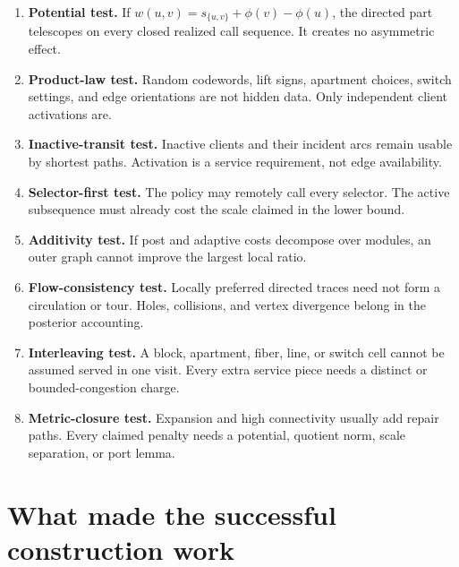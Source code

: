 \documentclass[11pt,a4paper]{article}
\begin{document}
\begin{enumerate}

\item \textbf{Potential test.}  If \(w(u,v)=s_{\{u,v\}}+\phi(v)-\phi(u)\), the directed part telescopes on every closed realized call sequence.  It creates no asymmetric effect.

\item \textbf{Product-law test.}  Random codewords, lift signs, apartment choices, switch settings, and edge orientations are not hidden data.  Only independent client activations are.

\item \textbf{Inactive-transit test.}  Inactive clients and their incident arcs remain usable by shortest paths.  Activation is a service requirement, not edge availability.

\item \textbf{Selector-first test.}  The policy may remotely call every selector. The active subsequence must already cost the scale claimed in the lower bound.

\item \textbf{Additivity test.}  If post and adaptive costs decompose over modules, an outer graph cannot improve the largest local ratio.

\item \textbf{Flow-consistency test.}  Locally preferred directed traces need not form a circulation or tour.  Holes, collisions, and vertex divergence belong in the posterior accounting.

\item \textbf{Interleaving test.}  A block, apartment, fiber, line, or switch cell cannot be assumed served in one visit.  Every extra service piece needs a distinct or bounded-congestion charge.

\item \textbf{Metric-closure test.}  Expansion and high connectivity usually add repair paths.  Every claimed penalty needs a potential, quotient norm, scale separation, or port lemma.

\end{enumerate}

\section*{What made the successful construction work}

\end{document}
